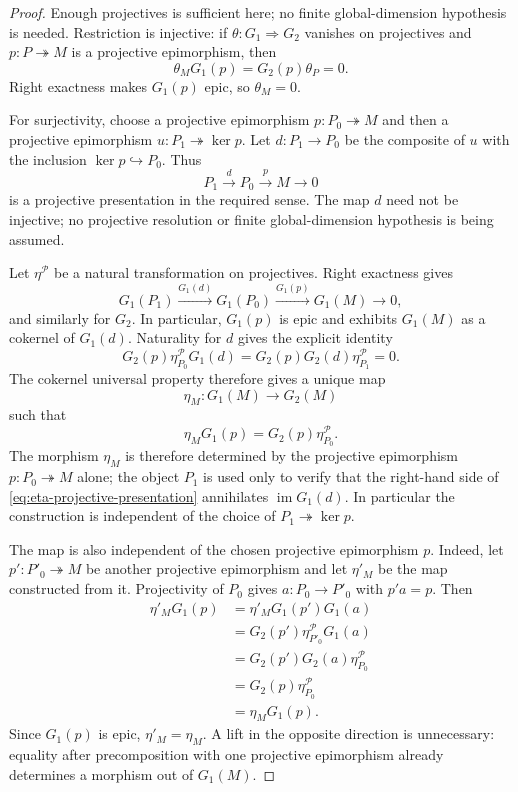\documentclass[12pt,leqno]{amsart}
\numberwithin{equation}{section}
\begin{document}
\begin{proof}
Enough projectives is sufficient here; no finite global-dimension
hypothesis is needed.  Restriction is injective: if
$\theta:G_1\Rightarrow G_2$ vanishes on projectives and
$p:P\twoheadrightarrow M$ is a projective epimorphism, then
\[
 \theta_MG_1(p)=G_2(p)\theta_P=0.
\]
Right exactness makes $G_1(p)$ epic, so $\theta_M=0$.

For surjectivity, choose a projective epimorphism
$p:P_0\twoheadrightarrow M$ and then a projective epimorphism
$u:P_1\twoheadrightarrow\ker p$.  Let
$d:P_1\to P_0$ be the composite of $u$ with the inclusion
$\ker p\hookrightarrow P_0$.  Thus
\[
 P_1\xrightarrow d P_0\xrightarrow p M\longrightarrow0
\]
is a projective presentation in the required sense.  The map $d$ need
not be injective; no projective resolution or finite global-dimension
hypothesis is being assumed.

Let $\eta^{\mathcal P}$ be a natural transformation on projectives.
Right exactness gives
\[
 G_1(P_1)\xrightarrow{G_1(d)}G_1(P_0)
 \xrightarrow{G_1(p)}G_1(M)\to0,
\]
and similarly for $G_2$.  In particular, $G_1(p)$ is epic and exhibits
$G_1(M)$ as a cokernel of $G_1(d)$.  Naturality for $d$ gives the
explicit identity
\[
 G_2(p)\eta^{\mathcal P}_{P_0}G_1(d)
 =G_2(p)G_2(d)\eta^{\mathcal P}_{P_1}=0.
\]
The cokernel universal property therefore gives a unique map
\[
 \eta_M:G_1(M)\longrightarrow G_2(M)
\]
such that
\begin{equation}\label{eq:eta-projective-presentation}
 \eta_MG_1(p)=G_2(p)\eta^{\mathcal P}_{P_0}.
\end{equation}
The morphism $\eta_M$ is therefore determined by the projective
epimorphism $p:P_0\twoheadrightarrow M$ alone; the object $P_1$ is used
only to verify that the right-hand side of
\eqref{eq:eta-projective-presentation} annihilates
$\operatorname{im}G_1(d)$.  In particular the construction is independent
of the choice of $P_1\twoheadrightarrow\ker p$.

The map is also independent of the chosen projective epimorphism $p$.  Indeed, let
$p':P'_0\twoheadrightarrow M$ be another projective epimorphism and let
$\eta'_M$ be the map constructed from it.  Projectivity of $P_0$ gives
$a:P_0\to P'_0$ with $p'a=p$.  Then
\begin{align*}
 \eta'_M G_1(p)
 &=\eta'_M G_1(p')G_1(a)\\
 &=G_2(p')\eta^{\mathcal P}_{P'_0}G_1(a)\\
 &=G_2(p')G_2(a)\eta^{\mathcal P}_{P_0}\\
 &=G_2(p)\eta^{\mathcal P}_{P_0}\\
 &=\eta_MG_1(p).
\end{align*}
Since $G_1(p)$ is epic, $\eta'_M=\eta_M$.  A lift in the opposite
direction is unnecessary: equality after precomposition with one
projective epimorphism already determines a morphism out of $G_1(M)$.


\end{proof}
\end{document}
